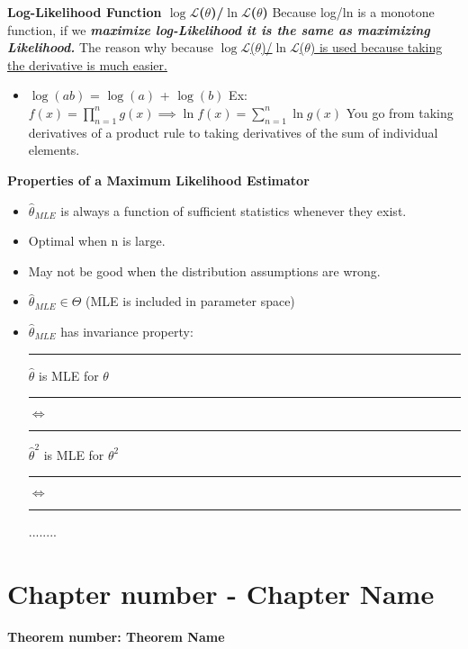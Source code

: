 \documentclass[]{article}
\begin{document}
\Large\textbf{Log-Likelihood Function $\log\mathcal{L}$($\theta$)/$\ln\mathcal{L}$($\theta$)}
\newline Because log/ln is a monotone function, if we \textbf{\textit{maximize log-Likelihood it is the same as maximizing Likelihood.} } The reason why  because \ul{$\log\mathcal{L}$($\theta$)/$\ln\mathcal{L}$($\theta$) is used because taking the derivative is much easier.}
\begin{itemize}
	\item $\log(ab)$ = $\log(a)$ + $\log(b)$
	\newline Ex: $f(x) = \displaystyle\prod_{n=1}^{n}g(x) \implies \ln{f(x)} =  \sum_{n=1}^{n} \ln g(x)$ 
	 \newline You go from taking derivatives of a product rule to taking derivatives of the sum of  individual elements.
\end{itemize}

\newpage
\Large\textbf{Properties of a Maximum Likelihood Estimator}
\begin{itemize}
	\item $\hat\theta_{MLE}$ is always a function of sufficient statistics whenever they exist.
	\item Optimal when n is large.
	\item May not be good when the distribution assumptions are wrong.
	\item $\hat\theta_{MLE} \in \Theta$ (MLE is included in parameter space)
	\item $\hat\theta_{MLE}$ has invariance property:
	\newline\Large\rule{7cm}{0pt} $\hat\theta$ is MLE for $\theta$ 
	\newline\Large\rule{8cm}{0pt} $\iff$ 
	\newline\Large\rule{7cm}{0pt} $\hat\theta^2$ is MLE for $\theta^2$ 
	\newline\Large\rule{8cm}{0pt} $\iff$ 
	\newline\Large\rule{8cm}{0pt} ........
\end{itemize}

\newpage
\section{Chapter number - Chapter Name}
\Large\textbf{Theorem number: Theorem Name}
\end{document}
